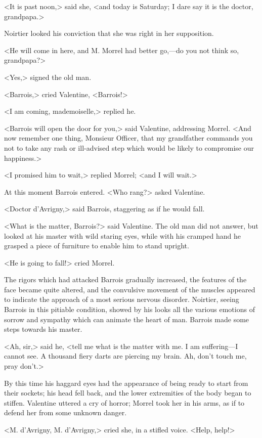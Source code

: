  <It is past noon,> said she, <and today is Saturday; I dare say it is the doctor, grandpapa.> 

 Noirtier looked his conviction that she was right in her supposition. 

 <He will come in here, and M. Morrel had better go,—do you not think so, grandpapa?> 

 <Yes,> signed the old man. 

 <Barrois,> cried Valentine, <Barrois!> 

 <I am coming, mademoiselle,> replied he. 

 <Barrois will open the door for you,> said Valentine, addressing Morrel. <And now remember one thing, Monsieur Officer, that my grandfather commands you not to take any rash or ill-advised step which would be likely to compromise our happiness.>

<I promised him to wait,> replied Morrel; <and I will wait.> 

 At this moment Barrois entered. <Who rang?> asked Valentine. 

 <Doctor d'Avrigny,> said Barrois, staggering as if he would fall. 

 <What is the matter, Barrois?> said Valentine. The old man did not answer, but looked at his master with wild staring eyes, while with his cramped hand he grasped a piece of furniture to enable him to stand upright. 

 <He is going to fall!> cried Morrel. 

 The rigors which had attacked Barrois gradually increased, the features of the face became quite altered, and the convulsive movement of the muscles appeared to indicate the approach of a most serious nervous disorder. Noirtier, seeing Barrois in this pitiable condition, showed by his looks all the various emotions of sorrow and sympathy which can animate the heart of man. Barrois made some steps towards his master. 

 <Ah, sir,> said he, <tell me what is the matter with me. I am suffering—I cannot see. A thousand fiery darts are piercing my brain. Ah, don't touch me, pray don't.> 

 By this time his haggard eyes had the appearance of being ready to start from their sockets; his head fell back, and the lower extremities of the body began to stiffen. Valentine uttered a cry of horror; Morrel took her in his arms, as if to defend her from some unknown danger. 

 <M. d'Avrigny, M. d'Avrigny,> cried she, in a stifled voice. <Help, help!> 

